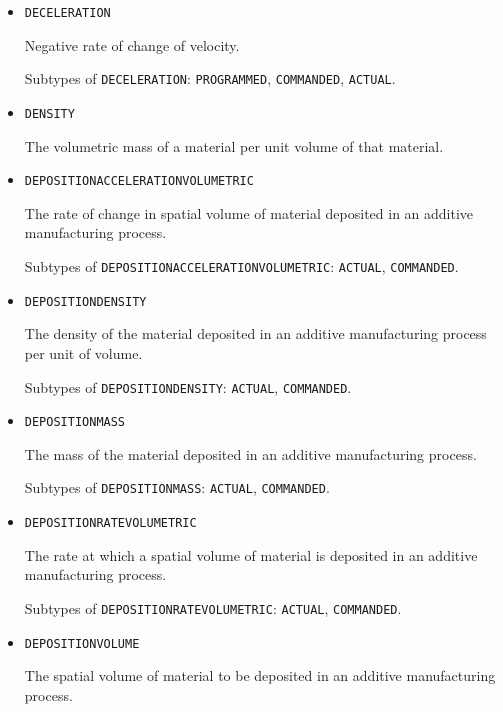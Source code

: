 \begin{itemize}
Subtypes of \texttt{CUTTING\textunderscore SPEED}: \texttt{ACTUAL}, \texttt{COMMANDED}, \texttt{PROGRAMMED}.

\item \texttt{DECELERATION}  

Negative rate of change of velocity.

Subtypes of \texttt{DECELERATION}: \texttt{PROGRAMMED}, \texttt{COMMANDED}, \texttt{ACTUAL}.

\item \texttt{DENSITY}  

The volumetric mass of a material per unit volume of that material.


\item \texttt{DEPOSITION\textunderscore ACCELERATION\textunderscore VOLUMETRIC}  

The rate of change in spatial volume of material deposited in an additive manufacturing process.

Subtypes of \texttt{DEPOSITION\textunderscore ACCELERATION\textunderscore VOLUMETRIC}: \texttt{ACTUAL}, \texttt{COMMANDED}.

\item \texttt{DEPOSITION\textunderscore DENSITY}  

The density of the material deposited in an additive manufacturing process per unit of volume.

Subtypes of \texttt{DEPOSITION\textunderscore DENSITY}: \texttt{ACTUAL}, \texttt{COMMANDED}.

\item \texttt{DEPOSITION\textunderscore MASS}  

The mass of the material deposited in an additive manufacturing process.

Subtypes of \texttt{DEPOSITION\textunderscore MASS}: \texttt{ACTUAL}, \texttt{COMMANDED}.

\item \texttt{DEPOSITION\textunderscore RATE\textunderscore VOLUMETRIC}  

The rate at which a spatial volume of material is deposited in an additive manufacturing process.

Subtypes of \texttt{DEPOSITION\textunderscore RATE\textunderscore VOLUMETRIC}: \texttt{ACTUAL}, \texttt{COMMANDED}.

\item \texttt{DEPOSITION\textunderscore VOLUME}  

The spatial volume of material to be deposited in an additive manufacturing process.


\end{itemize}
